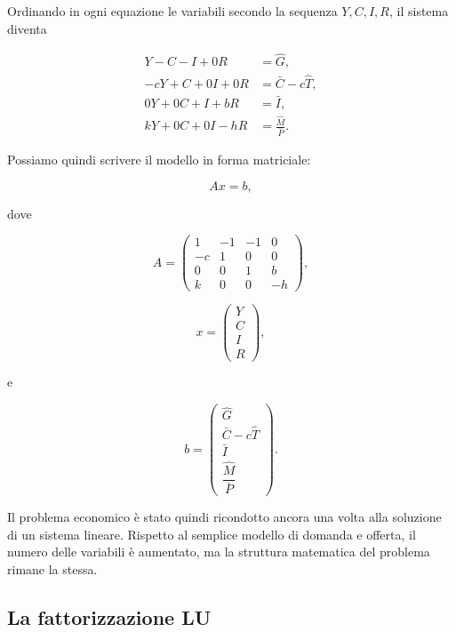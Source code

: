 Ordinando in ogni equazione le variabili secondo la sequenza
$Y,C,I,R$, il sistema diventa

\begin{align}
    Y-C-I+0R
        &=\hat G,\\
    -cY+C+0I+0R
        &=\bar C-c\hat T,\\
    0Y+0C+I+bR
        &=\bar I,\\
    kY+0C+0I-hR
        &=\frac{\hat M}{\bar P}.
\end{align}

Possiamo quindi scrivere il modello in forma matriciale:

\begin{equation*}
    Ax=b,
    \label{eq:islm-matrix}
\end{equation*}

dove

\begin{equation*}
A=
\begin{pmatrix}
    1  & -1 & -1 & 0\\
    -c & 1  & 0  & 0\\
    0  & 0  & 1  & b\\
    k  & 0  & 0  & -h
\end{pmatrix},
\end{equation*}

\begin{equation*}
x=
\begin{pmatrix}
    Y\\
    C\\
    I\\
    R
\end{pmatrix},
\end{equation*}

e

\begin{equation*}
b=
\begin{pmatrix}
    \hat G\\
    \bar C-c\hat T\\
    \bar I\\
    \dfrac{\hat M}{\bar P}
\end{pmatrix}.
\end{equation*}

Il problema economico è stato quindi ricondotto ancora una volta
alla soluzione di un sistema lineare. Rispetto al semplice modello
di domanda e offerta, il numero delle variabili è aumentato, ma la
struttura matematica del problema rimane la stessa.


\subsection{La fattorizzazione LU}


